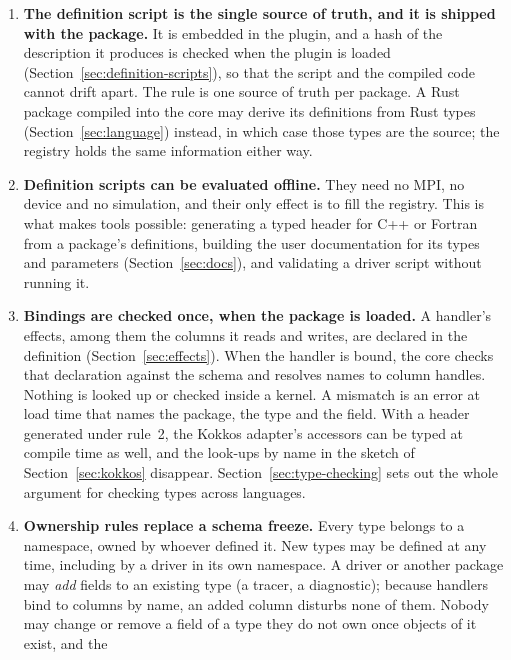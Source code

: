 \documentclass[11pt,a4paper]{article}
\begin{document}
\begin{enumerate}
  \item \textbf{The definition script is the single source of truth, and it
        is shipped with the package.}  It is embedded in the plugin, and a
        hash of the description it produces is checked when the plugin is
        loaded (Section~\ref{sec:definition-scripts}), so that the script
        and the compiled code cannot drift apart.  The rule is one source of
        truth per package.  A Rust package compiled into the core may derive
        its definitions from Rust types (Section~\ref{sec:language})
        instead, in which case those types are the source; the registry
        holds the same information either way.
  \item \textbf{Definition scripts can be evaluated offline.}  They need no
        MPI, no device and no simulation, and their only effect is to fill
        the registry.  This is what makes tools possible: generating a typed
        header for C++ or Fortran from a package's definitions, building
        the user documentation for its types and parameters
        (Section~\ref{sec:docs}), and validating a driver script without
        running it.
  \item \textbf{Bindings are checked once, when the package is loaded.}  A
        handler's effects, among them the columns it reads and writes, are
        declared in the definition (Section~\ref{sec:effects}).  When the handler is bound,
        the core checks that declaration against the schema and resolves
        names to column handles.  Nothing is looked up or checked inside a
        kernel.  A mismatch is an error at load time that names the package,
        the type and the field.  With a header generated under rule~2, the
        Kokkos adapter's accessors can be typed at compile time as well, and
        the look-ups by name in the sketch of Section~\ref{sec:kokkos}
        disappear.  Section~\ref{sec:type-checking} sets out the whole
        argument for checking types across languages.
  \item \textbf{Ownership rules replace a schema freeze.}  Every type belongs
        to a namespace, owned by whoever defined it.  New types may be
        defined at any time, including by a driver in its own namespace.  A
        driver or another package may \emph{add} fields to an existing type
        (a tracer, a diagnostic); because handlers bind to columns by name,
        an added column disturbs none of them.  Nobody may change or remove
        a field of a type they do not own once objects of it exist, and the

\end{enumerate}
\end{document}
